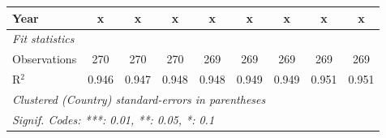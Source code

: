\begin{table}[htbp]
\begin{tabular}{lcccccccc}
      Year                                    & x              & x              & x             & x             & x             & x             & x              & x\\  
      \midrule \emph{Fit statistics}\\
      Observations                            & 270            & 270            & 270           & 269           & 269           & 269           & 269            & 269\\  
      R$^2$                                   & 0.946          & 0.947          & 0.948         & 0.948         & 0.949         & 0.949         & 0.951          & 0.951\\  
      \midrule
      \multicolumn{9}{l}{\emph{Clustered (Country) standard-errors in parentheses}}\\
      \multicolumn{9}{l}{\emph{Signif. Codes: ***: 0.01, **: 0.05, *: 0.1}}\\
   \end{tabular}
\end{table}


